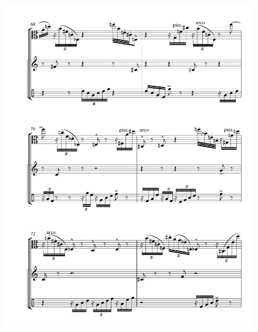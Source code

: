 \begin{figure}[htbp]
    \centering
	\includegraphics[width=6.5in]{figures/Viola_Percussion_10.pdf}
\end{figure}

